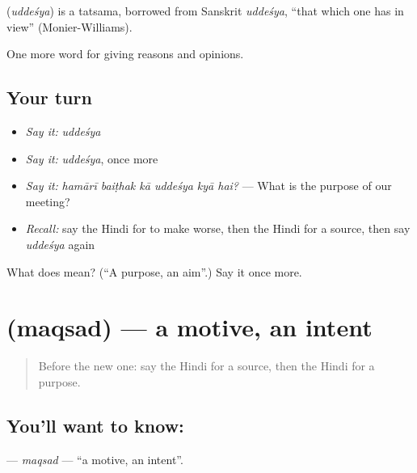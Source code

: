 \begin{cousinweb}
\textbf{} (\emph{uddeśya}) is a tatsama, borrowed from Sanskrit \emph{uddeśya}, \textquotedblleft{}that which one has in view\textquotedblright{} (Monier-Williams).
\end{cousinweb}

\begin{grammarlens}[title={What you've built}]
One more word for giving reasons and opinions.
\end{grammarlens}

\subsection*{Your turn}
\begin{itemize}
\raggedright
  \item \emph{Say it:} \emph{uddeśya}
  \item \emph{Say it:} \emph{uddeśya}, once more
  \item \emph{Say it:} \emph{hamārī baiṭhak kā uddeśya kyā hai?} — What is the purpose of our meeting?
  \item \emph{Recall:} say the Hindi for to make worse, then the Hindi for a source, then say \emph{uddeśya} again
\end{itemize}

\begin{tcolorbox}[breakable,colback=teal!4,colframe=teal!35!black,title={Before you move on}]
What does  mean? (\textquotedblleft{}A purpose, an aim\textquotedblright{}.) Say it once more.
\end{tcolorbox}
\section[\texorpdfstring{\hi{मक़सद} (maqsad)}{मक़सद (maqsad)}]{ (maqsad) — a motive, an intent}

\label{lesson:HI-C345-maqsad}



\begin{quote}
Before the new one: say the Hindi for a source, then the Hindi for a purpose.
\end{quote}

\subsection*{You'll want to know: }
\textbf{} — \emph{maqsad} — \textquotedblleft{}a motive, an intent\textquotedblright{}.

